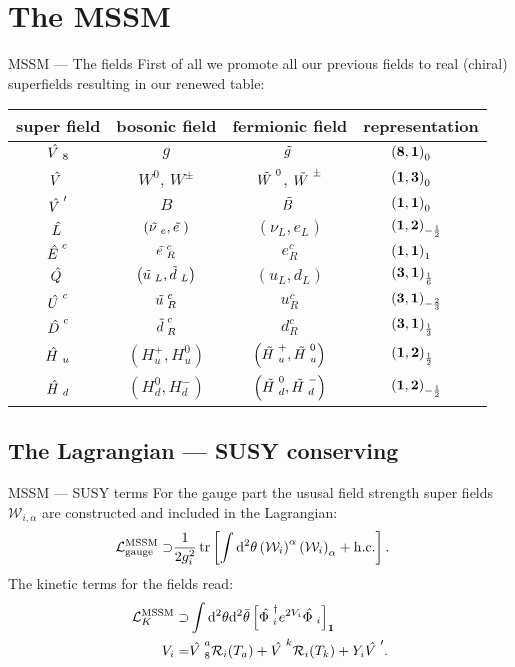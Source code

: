 \section{The MSSM}
\begin{frame}{MSSM — The fields}
First of all we promote all our previous fields to real (chiral) superfields resulting in our renewed table:\vfill
\begin{table}
\begin{tabular}{cccl}
  super field& bosonic field& fermionic field& representation\\\hline
  $\myhat{V}_8$& $g$& $\mytilde{g}$& $\quad\quad\left(\mathbf{8}, \mathbf{1}\right)_{0}$\\
  $\myhat{V}$& $W^0$, $W^\pm$& $\mytilde{W}^0$, $\mytilde{W}^\pm$& $\quad\quad\left(\mathbf{1}, \mathbf{3}\right)_{0}$\\
  $\myhat{V}'$& $B$& $\mytilde{B}$& $\quad\quad\left(\mathbf{1}, \mathbf{1}\right)_{0}$\\
  $\myhat{L}$& $\left(\mytilde{\nu}_e, \mytilde{e}\right)$& $\left(\nu_L, e_L\right)$& $\quad\quad\left(\mathbf{1}, \mathbf{2}\right)_{-\frac12}$\\
  $\myhat{E}^c$& $\mytilde{e}_R^c$& $e_R^c$& $\quad\quad\left(\mathbf{1}, \mathbf{1}\right)_{1}$\\
  $\myhat{Q}$& $\left(\mytilde{u}_L, \mytilde{d}_L\right)$& $\left(u_L, d_L\right)$& $\quad\quad\left(\mathbf{3}, \mathbf{1}\right)_{\frac16}$\\
  $\myhat{U}^c$& $\mytilde{u}_R^c$& $u_R^c$& $\quad\quad\left(\mathbf{3}, \mathbf{1}\right)_{-\frac23}$\\
  $\myhat{D}^c$& $\mytilde{d}_R^c$& $d_R^c$& $\quad\quad\left(\mathbf{3}, \mathbf{1}\right)_{\frac13}$\\
  $\myhat{H}_u$& $\left(H_u^+, H_u^0\right)$& $\left(\mytilde{H}_u^+, \mytilde{H}_u^0\right)$& $\quad\quad\left(\mathbf{1}, \mathbf{2}\right)_{\frac12}$\\
  $\myhat{H}_d$& $\left(H_d^0, H_d^-\right)$& $\left(\mytilde{H}^0_d, \mytilde{H}_d^-\right)$& $\quad\quad\left(\mathbf{1}, \mathbf{2}\right)_{-\frac12}$
\end{tabular}
\end{table}
\end{frame}

\subsection{The Lagrangian — SUSY conserving}
\begin{frame}{MSSM — SUSY terms}
For the gauge part the ususal field strength super fields $\mathcal{W}_{i, \alpha}$ are constructed and included in the Lagrangian:
\begin{align}
  \mathcal{L}^\mathrm{MSSM}_\mathrm{gauge}\supset&\frac1{2g_i^2}\tr\left[\int\dd^2\theta\left(\mathcal{W}_i\right)^\alpha\left(\mathcal{W}_i\right)_\alpha+\mathrm{h. c.}\right].
\end{align}
The kinetic terms for the fields read:
\begin{align}
  \mathcal{L}^\mathrm{MSSM}_K\supset&\int\dd^2\theta\dd^2\bar{\theta}\left[\myhat{\Phi}^\dagger_ie^{2V_i}\myhat{\Phi}_i\right]_\numb{1}\\
  V_i=&\myhat{V}_8^a\mathcal{R}_i(T_a)+\myhat{V}^k\mathcal{R}_i(T_k)+Y_i\myhat{V}'.
\end{align}
\end{frame}

